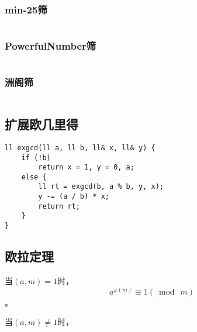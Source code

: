 \documentclass[twoside]{article}
\begin{document}
\subsubsection{min-25筛}
\begin{lstlisting}

\end{lstlisting}
\subsubsection{PowerfulNumber筛}
\begin{lstlisting}

\end{lstlisting}
\subsubsection{洲阁筛}
\begin{lstlisting}

\end{lstlisting}
\subsection{扩展欧几里得}
\begin{lstlisting}
ll exgcd(ll a, ll b, ll& x, ll& y) {
	if (!b)
		return x = 1, y = 0, a;
	else {
		ll rt = exgcd(b, a % b, y, x);
		y -= (a / b) * x;
		return rt;
	}
}\end{lstlisting}
\subsection{欧拉定理}
当$(a,m)=1$时，
$$a^{\varphi(m)}\equiv 1(\bmod\ m)$$。

当$(a,m)\neq 1$时，
\end{document}
